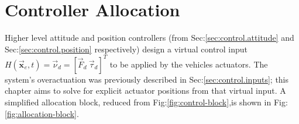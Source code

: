 \chapter{Controller Allocation}
\label{ch:allocation}
Higher level attitude and position controllers (from Sec:\ref{sec:control.attitude} and Sec:\ref{sec:control.position} respectively) design a virtual control input $H(\vec{\mathbf{x}}_e,t)=\vec{\nu}_d=[\vec{F}_d~\vec{\tau}_d]^T$ to be applied by the vehicles actuators. The system's overactuation was previously described in Sec:\ref{sec:control.inputs}; this chapter aims to solve for explicit actuator positions from that virtual input. A simplified allocation block, reduced from Fig:\ref{fig:control-block},is shown in Fig:\ref{fig:allocation-block}.
